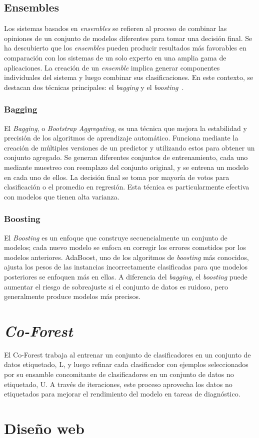 \subsection{Ensembles}
Los sistemas basados en \textit{ensembles} se refieren al proceso de combinar las opiniones de un conjunto de modelos diferentes para tomar una decisión final. Se ha descubierto que los \textit{ensembles} pueden producir resultados más favorables en comparación con los sistemas de un solo experto en una amplia gama de aplicaciones. La creación de un \textit{ensemble} implica generar componentes individuales del sistema y luego combinar sus clasificaciones. En este contexto, se destacan dos técnicas principales: el \textit{bagging} y el \textit{boosting}~\cite{ensembles}.

\subsubsection{Bagging}
El \textit{Bagging}, o \textit{Bootstrap Aggregating}, es una técnica que mejora la estabilidad y precisión de los algoritmos de aprendizaje automático. Funciona mediante la creación de múltiples versiones de un predictor y utilizando estos para obtener un conjunto agregado. Se generan diferentes conjuntos de entrenamiento, cada uno mediante muestreo con reemplazo del conjunto original, y se entrena un modelo en cada uno de ellos. La decisión final se toma por mayoría de votos para clasificación o el promedio en regresión. Esta técnica es particularmente efectiva con modelos que tienen alta varianza.

\subsubsection{Boosting}
El \textit{Boosting} es un enfoque que construye secuencialmente un conjunto de modelos; cada nuevo modelo se enfoca en corregir los errores cometidos por los modelos anteriores. AdaBoost, uno de los algoritmos de \textit{boosting} más conocidos, ajusta los pesos de las instancias incorrectamente clasificadas para que modelos posteriores se enfoquen más en ellas. A diferencia del \textit{bagging}, el \textit{boosting} puede aumentar el riesgo de sobreajuste si el conjunto de datos es ruidoso, pero generalmente produce modelos más precisos.

\section{\textit{Co-Forest}}
El Co-Forest trabaja al entrenar un conjunto de clasificadores en un conjunto de datos etiquetado, L, y luego refinar cada clasificador con ejemplos seleccionados por su ensamble concomitante de clasificadores en un conjunto de datos no etiquetado, U. A través de iteraciones, este proceso aprovecha los datos no etiquetados para mejorar el rendimiento del modelo en tareas de diagnóstico.





\cite{IEEE:CoForest}

\section{Diseño web}




